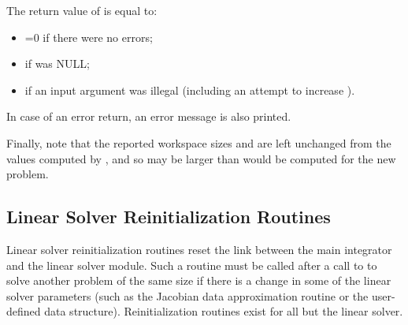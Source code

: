 The return value  of  is equal to: 
\begin{itemize}
\item {}=0 if there were no errors; 
\item {} if  was NULL;
\item {} if an input argument was illegal    
      (including an attempt to increase ).
\end{itemize}
In case of an error return, an error message is also printed.  

Finally, note that the reported workspace sizes \id{[LENRW]} 
and \id{[LENIW]} are left unchanged from the values computed 
by , and so may be larger than would be computed for 
the new problem.

\subsection{Linear Solver Reinitialization Routines}\label{sss:lin_solv_reinit}

Linear solver reinitialization routines reset the link between the main {\cvodes}
integrator and the linear solver module. Such a routine must be called after a call
to  to solve another problem of the same size if there is a change
in some of the linear solver parameters (such as the Jacobian data approximation
routine or the user-defined data structure). Reinitialization routines exist for
all but the {\cvdiag} linear solver.

